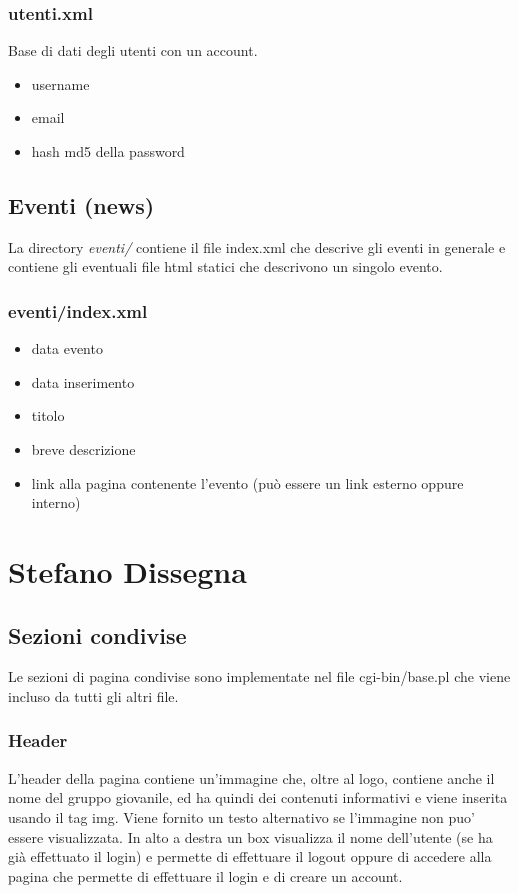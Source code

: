 \documentclass[a4paper,10pt]{article}
\begin{document}
\subsubsection{utenti.xml}
Base di dati degli utenti con un account.
\begin{itemize}
 \item username
 \item email
 \item hash md5 della password
\end{itemize}

\subsection{Eventi (news)}
La directory \textit{eventi/} contiene il file index.xml che descrive gli eventi in generale e contiene gli eventuali file html statici che descrivono un singolo evento.
 
\subsubsection{eventi/index.xml}
\begin{itemize}
 \item data evento
 \item data inserimento
 \item titolo
 \item breve descrizione
 \item link alla pagina contenente l'evento (pu\`o essere un link esterno oppure interno)
\end{itemize}

\section{Stefano Dissegna}

\subsection{Sezioni condivise}
Le sezioni di pagina condivise sono implementate nel file cgi-bin/base.pl che viene incluso da tutti gli altri file.

\subsubsection{Header}
L'header della pagina contiene un'immagine che, oltre al logo, contiene anche il
nome del gruppo giovanile, ed ha quindi dei contenuti informativi e viene inserita usando il tag 
img. Viene fornito un testo alternativo se l'immagine non puo' essere visualizzata.
In alto a destra un box visualizza il nome dell'utente (se ha gi\`a effettuato il login) e permette
di effettuare il logout oppure di accedere alla pagina che permette di effettuare il login e di creare un account.
\end{document}
